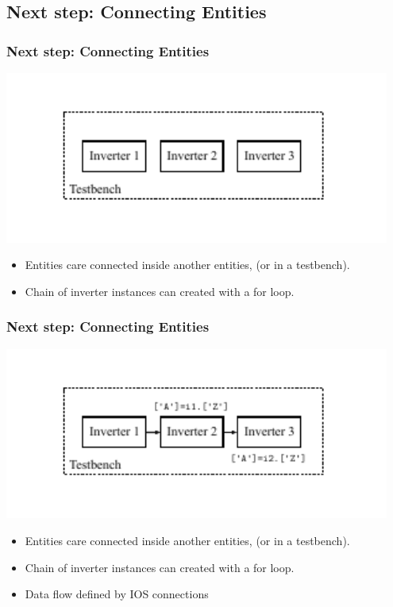 \documentclass{sdkslides}
\begin{document}
\renewcommand{\sectionname}{Next step: Connecting Entities}
\subsection*{\sectionname}
\begin{frame}[t]
    \frametitle{\sectionname}
    \begin{center}
        \includegraphics[width=0.95\textwidth]{Pics/inverter_chain_0}
    \end{center}
    \begin{itemize}
        \item Entities care connected inside another entities, (or in a
            testbench).
        \item Chain of inverter instances can created with a for loop.
    \end{itemize}
\end{frame}

\begin{frame}[t]
    \frametitle{\sectionname}
    \begin{center}
        \includegraphics[width=0.95\textwidth]{Pics/inverter_chain_2}
    \end{center}
    \begin{itemize}
        \item Entities care connected inside another entities, (or in a
            testbench).
        \item Chain of inverter instances can created with a for loop.
        \item Data flow defined by IOS connections
    \end{itemize}
\end{frame}
\end{document}
